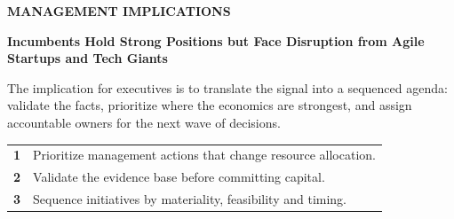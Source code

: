 \documentclass[10pt,a4paper]{article}
\begin{document}
\clearpage
{\textcolor{BOBlue}{\scriptsize\bfseries MANAGEMENT IMPLICATIONS}}\par\vspace{-1pt}
{\Large\sffamily\bfseries\color{BONavy} Incumbents Hold Strong Positions but Face Disruption from Agile Startups and Tech Giants}\par\vspace{4pt}
{\small The implication for executives is to translate the signal into a sequenced agenda: validate the facts, prioritize where the economics are strongest, and assign accountable owners for the next wave of decisions.}\par
\begin{tabularx}{\linewidth}{p{10mm}Y}
\textcolor{BOBlue}{\bfseries 1} & Prioritize management actions that change resource allocation. \\[5pt]
\textcolor{BOBlue}{\bfseries 2} & Validate the evidence base before committing capital. \\[5pt]
\textcolor{BOBlue}{\bfseries 3} & Sequence initiatives by materiality, feasibility and timing. \\[5pt]
\end{tabularx}
\vspace{6pt}

\vspace{6pt}{\textcolor{BOBlue}{\scriptsize\bfseries EXECUTION ROADMAP}}\par
\begin{center}
\end{center}
\end{document}
